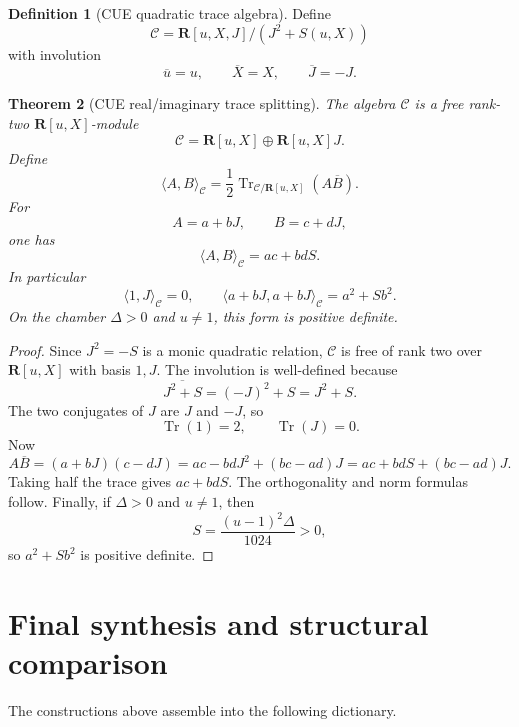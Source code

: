 \documentclass[11pt]{article}
\newcommand{\R}{\mathbf R}
\newcommand{\Tr}{\operatorname{Tr}}
\theoremstyle{plain}
\newtheorem{theorem}{Theorem}[section]
\theoremstyle{definition}
\newtheorem{definition}[theorem]{Definition}
\begin{document}
\begin{definition}[CUE quadratic trace algebra]\label{def:CUE-trace-algebra}
Define
\[
   \mathcal C=\R[u,X,J]/(J^2+S(u,X))
\]
with involution
\[
   \overline u=u,
   \qquad
   \overline X=X,
   \qquad
   \overline J=-J.
\]
\end{definition}

\begin{theorem}[CUE real/imaginary trace splitting]\label{thm:CUE-trace}
The algebra \(\mathcal C\) is a free rank-two \(\R[u,X]\)-module
\[
   \mathcal C=\R[u,X]\oplus\R[u,X]J.
\]
Define
\[
   \langle A,B\rangle_{\mathcal C}=\frac12\Tr_{\mathcal C/\R[u,X]}(A\overline B).
\]
For
\[
   A=a+bJ,
   \qquad
   B=c+dJ,
\]
one has
\[
   \langle A,B\rangle_{\mathcal C}=ac+bdS.
\]
In particular
\[
   \langle 1,J\rangle_{\mathcal C}=0,
   \qquad
   \langle a+bJ,a+bJ\rangle_{\mathcal C}=a^2+Sb^2.
\]
On the chamber \(\Delta>0\) and \(u\ne1\), this form is positive definite.
\end{theorem}

\begin{proof}
Since \(J^2=-S\) is a monic quadratic relation, \(\mathcal C\) is free of rank two over \(\R[u,X]\) with basis \(1,J\).  The involution is well-defined because
\[
   \overline{J^2+S}=(-J)^2+S=J^2+S.
\]
The two conjugates of \(J\) are \(J\) and \(-J\), so
\[
   \Tr(1)=2,
   \qquad
   \Tr(J)=0.
\]
Now
\[
   A\overline B=(a+bJ)(c-dJ)=ac-bdJ^2+(bc-ad)J=ac+bdS+(bc-ad)J.
\]
Taking half the trace gives \(ac+bdS\).  The orthogonality and norm formulas follow.  Finally, if \(\Delta>0\) and \(u\ne1\), then
\[
   S=\frac{(u-1)^2\Delta}{1024}>0,
\]
so \(a^2+Sb^2\) is positive definite.
\end{proof}

\section{Final synthesis and structural comparison}

The constructions above assemble into the following dictionary.
\end{document}
